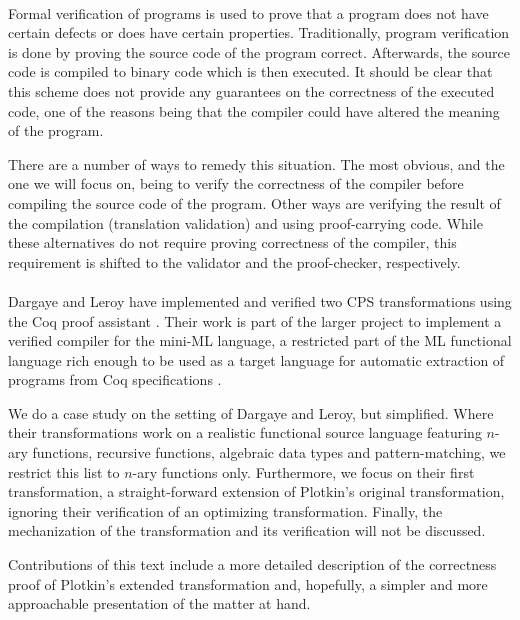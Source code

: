 \documentclass[a4paper,11pt,draft]{article}
\begin{document}
\paragraph{}

Formal verification of programs is used to prove that a program does not have certain
defects or does have certain properties. Traditionally, program verification is done
by proving the source code of the program correct. Afterwards, the source code is
compiled to binary code which is then executed. It should be clear that this scheme
does not provide any guarantees on the correctness of the executed code, one of the
reasons being that the compiler could have altered the meaning of the program.

There are a number of ways to remedy this situation. The most obvious, and the one we
will focus on, being to verify the correctness of the compiler before compiling the
source code of the program. Other ways are verifying the result of the compilation
(translation validation) \cite{Translation-Validation-98,Necula-00} and using
proof-carrying code. While these alternatives do not require proving correctness of
the compiler, this requirement is shifted to the validator and the proof-checker,
respectively.

\paragraph{}

Dargaye and Leroy \cite{Dargaye-Leroy-07} have implemented and verified two CPS
transformations using the Coq proof assistant \cite{Coq-89,CoqArt-04}. Their work is
part of the larger project to implement a verified compiler for the mini-ML language,
a restricted part of the ML functional language rich enough to be used as a target
language for automatic extraction of programs from Coq specifications
\cite{Letouzey-02}.

We do a case study on the setting of Dargaye and Leroy, but simplified. Where their
transformations work on a realistic functional source language featuring $n$-ary
functions, recursive functions, algebraic data types and pattern-matching, we restrict
this list to $n$-ary functions only. Furthermore, we focus on their first
transformation, a straight-forward extension of Plotkin's original transformation,
ignoring their verification of an optimizing transformation. Finally, the
mechanization of the transformation and its verification will not be discussed.

Contributions of this text include a more detailed description of the correctness
proof of Plotkin's extended transformation and, hopefully, a simpler and more
approachable presentation of the matter at hand.
\end{document}
